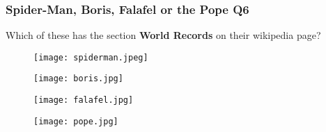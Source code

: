 \documentclass{beamer}
\begin{document}
\begin{frame}
\frametitle{Spider-Man, Boris, Falafel or the Pope Q6}
Which of these has the section \textbf{World Records} on their wikipedia page?
\begin{figure}[!htb]
    \centering
    \begin{minipage}{.5\textwidth}
        \centering
        \texttt{[image: spiderman.jpeg]}
        
    \end{minipage}%
    \begin{minipage}{0.5\textwidth}
        \centering
        \texttt{[image: boris.jpg]}
        
    \end{minipage}
\end{figure}
\begin{figure}[!htb]
    \centering
    \begin{minipage}{.5\textwidth}
        \centering
        \texttt{[image: falafel.jpg]}
        
    \end{minipage}%
    \begin{minipage}{0.5\textwidth}
        \centering
        \texttt{[image: pope.jpg]}
        
    \end{minipage}
\end{figure}
\end{frame}
\end{document}
